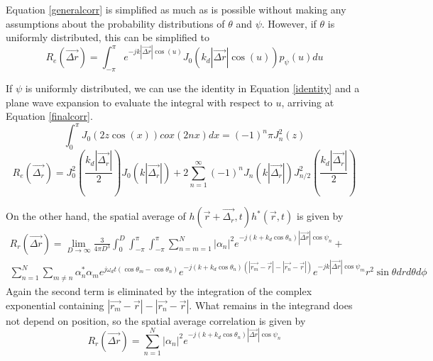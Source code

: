 \documentclass[11pt]{article} %
\begin{document}
Equation \ref{generalcorr} is simplified as much as is possible without making any assumptions about the probability distributions of $\theta$ and $\psi$.  However, if $\theta$ is uniformly distributed, this can be simplified to 
\begin{equation}
R_e(\vec{\Delta r})=\int_{-\pi}^{\pi}e^{-j k |\vec{\Delta r}| \cos(u)} J_0(k_d |\vec{\Delta r}| \cos(u))p_{\psi}(u) du 
\end{equation}

If $\psi$ is uniformly distributed, we can use the identity in Equation \ref{identity} \cite{integraltablebook} and a plane wave expansion to evaluate the integral with respect to $u$, arriving at Equation \ref{finalcorr}.
\begin{equation}\label{identity}
\int_0^{\pi} J_0(2z\cos(x))cox(2nx)dx = (-1)^n \pi J_n^2(z)
\end{equation}
\begin{equation}\label{finalcorr}
R_e(\vec{\Delta_r}) = J_0^2(\frac{k_d |\vec{\Delta_r}|}{2})J_0(k|\vec{\Delta_r}|) + 2\sum_{n=1}^{\infty}(-1)^n J_n(k|\vec{\Delta_r}|)J_{n/2}^2(\frac{k_d |\vec{\Delta_r}|}{2})
\end{equation}

On the other hand, the spatial average of $h(\vec{r}+\vec{\Delta_r},t)h^*(\vec{r},t)$ is given by
\begin{multline}
R_r\left(\vec{\Delta r}\right) =  \lim_{D \rightarrow \infty} \frac{3}{4\pi D^3}\int_0^D\int_{-\pi}^\pi \int_{-\pi}^{\pi} \sum_{n=m=1}^N |\alpha_n|^2 e^{-j(k+k_d\cos\theta_n)|\vec{\Delta r}|\cos \psi_n}+\\ \sum_{n=1}^N\sum_{m\neq n} \alpha_n^* \alpha_m e^{j \omega_d t(\cos \theta_m - \cos \theta_n)} e^{-j(k+k_d\cos\theta_n)\left(\left|\vec{r_m} - \vec{r}\right|-\left|\vec{r_n} - \vec{r}\right|\right)}e^{-jk\left|\vec{\Delta r}\right| \cos \psi_m}r^2 \sin\theta dr d\theta d\phi
\end{multline}
Again the second term is eliminated by the integration of the complex exponential containing $\left|\vec{r_m} - \vec{r}\right|-\left|\vec{r_n} - \vec{r}\right|$.  What remains in the integrand does not depend on position, so the spatial average correlation is given by 
\begin{equation}\label{spatialcorr}
R_r\left(\vec{\Delta r}\right) =  \sum_{n=1}^N |\alpha_n|^2 e^{-j(k+k_d\cos\theta_n)|\vec{\Delta r}|\cos \psi_n}
\end{equation}
\end{document}
